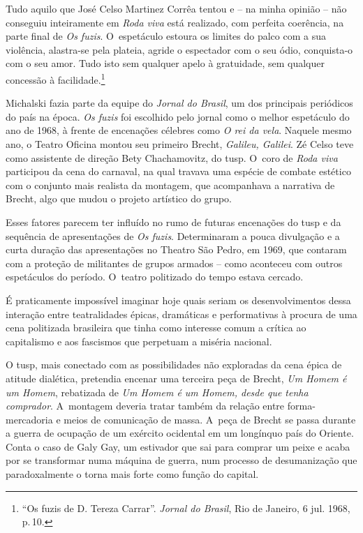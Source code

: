 \startblockquote
Tudo aquilo que José Celso Martinez Corrêa tentou e -- na minha opinião
-- não conseguiu inteiramente em {\it Roda viva} está realizado, com
perfeita coerência, na parte final de {\it Os fuzis}. O~espetáculo
estoura os limites do palco com a sua violência, alastra-se pela
plateia, agride o espectador com o seu ódio, conquista-o com o seu amor.
Tudo isto sem qualquer apelo à gratuidade, sem qualquer concessão à
facilidade.\footnote{“Os fuzis de D. Tereza Carrar”. {\it Jornal do
  Brasil}, Rio de Janeiro, 6 jul. 1968, p.\,10.}
\stopblockquote


Michalski fazia parte da equipe do {\it Jornal do Brasil}, um dos
principais periódicos do país na época. {\it Os fuzis} foi escolhido
pelo jornal como o melhor espetáculo do ano de 1968, à frente de
encenações célebres como {\it O rei da vela}. Naquele mesmo ano, o
Teatro Oficina montou seu primeiro Brecht, {\it Galileu, Galilei}. Zé
Celso teve como assistente de direção Bety Chachamovitz, do {\sc tusp}. O~coro
de {\it Roda viva} participou da cena do carnaval, na qual travava uma
espécie de combate estético com o conjunto mais realista da montagem,
que acompanhava a narrativa de Brecht, algo que mudou o projeto
artístico do grupo.

Esses fatores parecem ter influído no rumo de futuras encenações do {\sc tusp}
e da sequência de apresentações de {\it Os fuzis}. Determinaram a pouca
divulgação e a curta duração das apresentações no Theatro São Pedro, em
1969, que contaram com a proteção de militantes de grupos armados -- como
aconteceu com outros espetáculos do período. O~teatro politizado do
tempo estava cercado.

É praticamente impossível imaginar hoje quais seriam os desenvolvimentos
dessa interação entre teatralidades épicas, dramáticas e performativas à
procura de uma cena politizada brasileira que tinha como interesse comum
a crítica ao capitalismo e aos fascismos que perpetuam a miséria
nacional.

O {\sc tusp}, mais conectado com as possibilidades não exploradas da cena
épica de atitude dialética, pretendia encenar uma terceira peça de
Brecht, {\it Um Homem é um Homem}, rebatizada de {\it Um Homem é um
Homem, desde que tenha comprador}. A~montagem deveria tratar também da
relação entre forma-mercadoria e meios de comunicação de massa. A~peça
de Brecht se passa durante a guerra de ocupação de um exército ocidental
em um longínquo país do Oriente. Conta o caso de Galy Gay, um estivador
que sai para comprar um peixe e acaba por se transformar numa máquina de
guerra, num processo de desumanização que paradoxalmente o torna mais
forte como função do capital.

